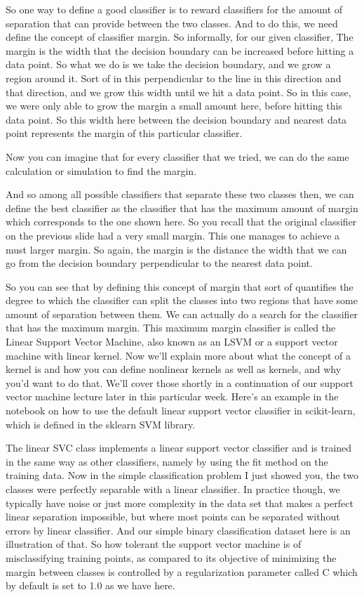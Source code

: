 \begin{multicols}{2}
So one way to define a good classifier is to reward classifiers for the amount of separation that can provide between the two classes. And to do this, we need define the concept of classifier margin. So informally, for our given classifier, The margin is the width that the decision boundary can be increased before hitting a data point. So what we do is we take the decision boundary, and we grow a region around it. Sort of in this perpendicular to the line in this direction and that direction, and we grow this width until we hit a data point. So in this case, we were only able to grow the margin a small amount here, before hitting this data point. So this width here between the decision boundary and nearest data point represents the margin of this particular classifier. 

Now you can imagine that for every classifier that we tried, we can do the same calculation or simulation to find the margin. 

And so among all possible classifiers that separate these two classes then, we can define the best classifier as the classifier that has the maximum amount of margin which corresponds to the one shown here. So you recall that the original classifier on the previous slide had a very small margin. This one manages to achieve a must larger margin. So again, the margin is the distance the width that we can go from the decision boundary perpendicular to the nearest data point. 

So you can see that by defining this concept of margin that sort of quantifies the degree to which the classifier can split the classes into two regions that have some amount of separation between them. We can actually do a search for the classifier that has the maximum margin. This maximum margin classifier is called the Linear Support Vector Machine, also known as an LSVM or a support vector machine with linear kernel. Now we'll explain more about what the concept of a kernel is and how you can define nonlinear kernels as well as kernels, and why you'd want to do that. We'll cover those shortly in a continuation of our support vector machine lecture later in this particular week. Here's an example in the notebook on how to use the default linear support vector classifier in scikit-learn, which is defined in the sklearn SVM library. 

The linear SVC class implements a linear support vector classifier and is trained in the same way as other classifiers, namely by using the fit method on the training data. Now in the simple classification problem I just showed you, the two classes were perfectly separable with a linear classifier. In practice though, we typically have noise or just more complexity in the data set that makes a perfect linear separation impossible, but where most points can be separated without errors by linear classifier. And our simple binary classification dataset here is an illustration of that. So how tolerant the support vector machine is of misclassifying training points, as compared to its objective of minimizing the margin between classes is controlled by a regularization parameter called C which by default is set to 1.0 as we have here. 


\end{multicols}
